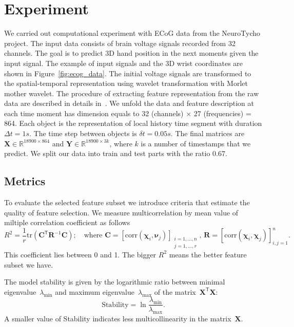 \documentclass[12pt,oneside]{article}
\theoremstyle{definition}
\newcommand{\bY}{\mathbf{Y}}
\newcommand{\bX}{\mathbf{X}}
\newcommand{\bC}{\mathbf{C}}
\newcommand{\bbR}{\mathbb{R}}
\newcommand{\T}{\mathsf{T}}
\newcommand{\bchi}{\boldsymbol{\chi}}
\newcommand{\bnu}{\boldsymbol{\nu}}
\begin{document}
\newpage
\section{Experiment}

We carried out computational experiment with ECoG data from the NeuroTycho project. The input data consists of brain voltage signals recorded from 32 channels.
The goal is to predict 3D hand position in the next moments given the input signal.
The example of input signals and the 3D wrist coordinates are shown in Figure~\ref{fig:ecog_data}.
The initial voltage signals are transformed to the spatial-temporal representation using wavelet transformation with Morlet mother wavelet.
The procedure of extracting feature representation from the raw data are described in details in~\cite{chao2010long,eliseyev2016penalized}.
We unfold the data and feature description at each time moment has dimension equals to 32 (channels) $\times$ 27 (frequencies) = 864.
Each object is the representation of local history time segment with duration $\Delta t = 1s$. The time step between objects is $\delta t =  0.05s$.
The final matrices are $\bX \in \bbR^{18900 \times 864}$ and $\bY \in \bbR^{18900 \times 3k}$, where $k$ is a number of timestamps that we predict.
We split our data into train and test parts with the ratio 0.67.

\subsection{Metrics}

To evaluate the selected feature subset we introduce criteria that estimate the quality of feature selection.
We measure multicorrelation by mean value of miltiple correlation coefficient as follows
\begin{equation}
R^2 = \frac{1}{r} \text{tr} \left( \bC^{\T} \mathbf{R}^{-1} \bC \right); \quad \text{where }\bC = [ \text{corr}(\bchi_i, \bnu_j)]_{\substack{i=1, \dots, n \\ j=1, \dots, r}}, \, \mathbf{R} = [ \text{corr}(\bchi_i, \bchi_j)]_{i, j = 1}^n.
\end{equation}
This coefficient lies between 0 and 1. The bigger $R^2$ means the better feature subset we have.

The model stability is given by the logarithmic ratio between minimal eigenvalue~$\lambda_{\min}$ and maximum eigenvalue~$\lambda_{\max}$ of the matrix~$\bX^{\T} \bX$:
\begin{equation}
\text{Stability} = \ln \frac{\lambda_{\min}}{\lambda_{\max}}.
\end{equation}
A smaller value of Stability indicates less multicollinearity in the matrix~$\bX$.
\end{document}
